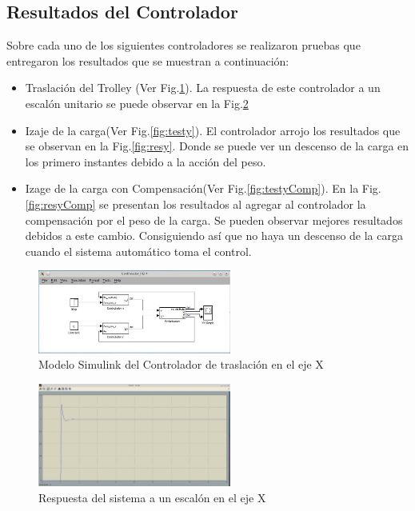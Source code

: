 \documentclass[journal]{IEEEtran}
\begin{document}
\subsection{Resultados del Controlador}
Sobre cada uno de los siguientes controladores se realizaron pruebas que
entregaron los resultados que se muestran a continuación:
\begin{itemize}
 \item Traslación del Trolley (Ver Fig.\ref{fig:testx}).
 La respuesta de este controlador a un escalón unitario se puede
 observar en la Fig.\ref{fig:resx}
 \item Izaje de la carga(Ver Fig.\ref{fig:testy}).
 El controlador arrojo los resultados que se observan en la Fig.\ref{fig:resy}. 
 Donde se puede ver un descenso de la carga en los primero instantes debido a la 
 acción del peso.
 \item Izage de la carga con Compensación(Ver Fig.\ref{fig:testyComp}).
 En la Fig.\ref{fig:resyComp} se presentan los resultados al agregar al
 controlador la compensación por el peso de la carga. Se pueden observar mejores
 resultados debidos a este cambio. Consiguiendo así que no haya un descenso de la
 carga cuando el sistema automático toma el control.
\end{itemize}


\begin{figure}[!t]
 \centering
  \includegraphics[width=2.5in]{Test_x.jpeg}
  \caption{Modelo Simulink del Controlador de traslación en el eje X}
  \label{fig:testx}
\end{figure}

\begin{figure}[!t]
 \centering
  \includegraphics[width=2.5in]{Test_x_posicion.jpeg}
  \caption{Respuesta del sistema a un escalón en el eje X}
  \label{fig:resx}
\end{figure}
\end{document}

